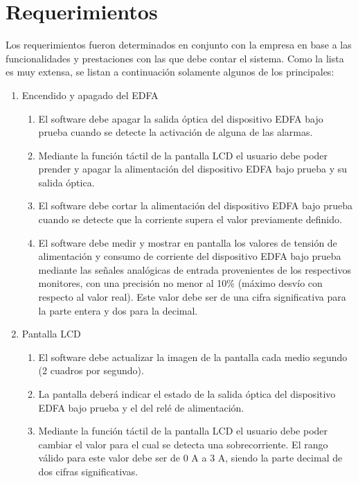 \section{Requerimientos}

Los requerimientos fueron determinados en conjunto con la empresa en base a las funcionalidades y prestaciones con las que debe contar el sistema. Como la lista es muy extensa, se listan a continuación solamente algunos de los principales:

\renewcommand{\labelenumii}{\arabic{enumi}.\arabic{enumii}}

\begin{enumerate}

\item Encendido y apagado del EDFA
	\begin{enumerate}
	\item El software debe apagar la salida óptica del dispositivo 			EDFA bajo prueba cuando se detecte la activación de alguna de las 		alarmas.
	\item Mediante la función táctil de la pantalla LCD el usuario 			debe poder prender y apagar la alimentación del dispositivo EDFA 		bajo prueba y su salida óptica.
	\item El software debe cortar la alimentación del dispositivo EDFA 	bajo prueba cuando se detecte que la corriente supera el valor 			previamente definido.
	\item El software debe medir y mostrar en pantalla los valores de 		tensión de alimentación y consumo de corriente del dispositivo 			EDFA bajo prueba mediante las señales analógicas de entrada 			provenientes de los respectivos monitores, con una precisión no 		menor al 10\% (máximo desvío con respecto al valor real). Este 			valor debe ser de una cifra significativa para la parte entera y 		dos para la decimal.
	\end{enumerate}

\item Pantalla LCD
	\begin{enumerate}
	\item El software debe actualizar la imagen de la pantalla cada 		medio segundo (2 cuadros por segundo).
	\item La pantalla deberá indicar el estado de la salida óptica del 	dispositivo EDFA bajo prueba y el del relé de alimentación.
	\item Mediante la función táctil de la pantalla LCD el usuario 			debe poder cambiar el valor para el cual se detecta una 				sobrecorriente. El rango válido para este valor debe ser de 0 A a 		3 A, siendo la parte decimal de dos cifras significativas.
	\end{enumerate}
	

\end{enumerate}
